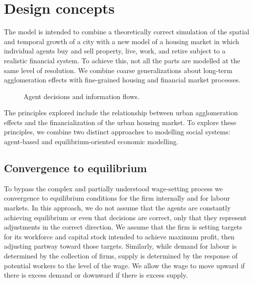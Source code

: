 \section{Design concepts} %
The model is intended to combine a theoretically correct simulation of the spatial and temporal growth of a city with a new model of a housing market in which individual agents buy and sell property, live, work, and retire subject to a realistic financial system. 
To achieve this, not all the parts are modelled at the same level of resolution. We combine coarse generalizations about long-term agglomeration effects with fine-grained housing and financial market processes. 



\begin{figure}[h!tb]
\centering \vspace{2.5cm}
    
\caption[Main Agent decisions and information flows]{Agent decisions and information flows.}
\label{fig:information-flows}
\end{figure}


The principles explored include the relationship between urban agglomeration effects and the financialization of the urban housing market. To explore these principles, we combine two distinct approaches to modelling social systems: agent-based and equilibrium-oriented economic modelling. 


\subsection{Convergence to equilibrium}
To bypass the complex and partially understood wage-setting process we convergence to equilibrium conditions for the firm internally and for  labour markets. In this approach, we do not assume that the agents are constantly achieving equilibrium or even that decisions are correct, only that they represent adjustments in the correct direction. We assume that the firm is setting targets for its workforce and capital stock intended to achieve maximum profit, then adjusting partway toward those targets. Similarly, while demand for labour is determined by the collection of firms, supply is determined by the response of potential workers to the level of the wage. We allow the wage to move upward if there is excess demand or downward if there is excess supply.

